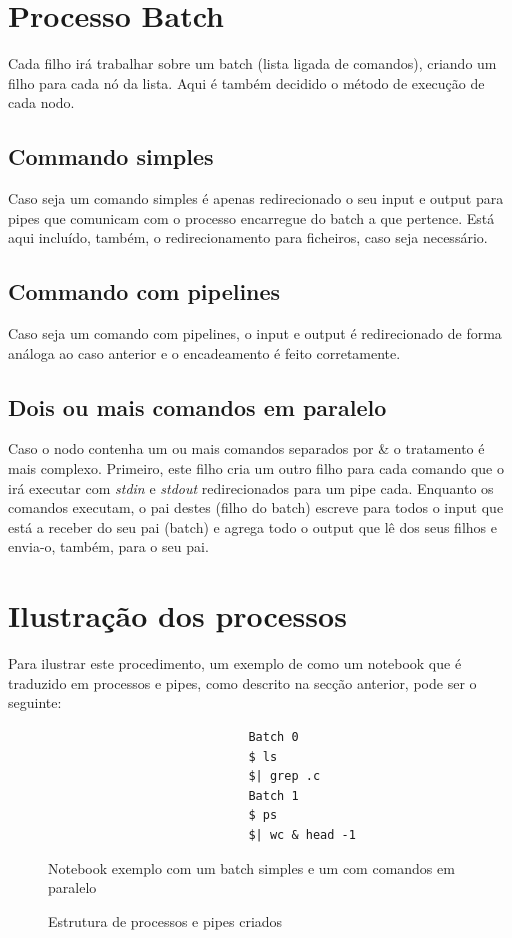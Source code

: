 \documentclass[12pt,a4paper]{report}
\begin{document}
    \section{Processo Batch}
        Cada filho irá trabalhar sobre um batch (lista ligada de comandos),
        criando um filho para cada nó da lista. Aqui é também decidido o método
        de execução de cada nodo.
        \subsection{Commando simples}
            Caso seja um comando simples é apenas redirecionado o seu input e
            output para pipes que comunicam com o processo encarregue do batch a
            que pertence. Está aqui incluído, também, o redirecionamento para
            ficheiros, caso seja necessário.
        \subsection{Commando com pipelines}
            Caso seja um comando com pipelines, o input e output é redirecionado
            de forma análoga ao caso anterior e o encadeamento é feito
            corretamente.
        \subsection{Dois ou mais comandos em paralelo}
            Caso o nodo contenha um ou mais comandos separados por \& o
            tratamento é mais complexo. Primeiro, este filho cria um outro
            filho para cada comando que o irá executar com \textit{stdin}
            e \textit{stdout} redirecionados para um pipe cada. Enquanto os
            comandos executam, o pai destes (filho do batch) escreve para todos
            o input que está a receber do seu pai (batch) e agrega todo o
            output que lê dos seus filhos e envia-o, também, para o seu pai.
\clearpage
    \section{Ilustração dos processos}
    Para ilustrar este procedimento, um exemplo de como um notebook que é
    traduzido em processos e pipes, como descrito na secção anterior, pode
    ser o seguinte:
    \begin{figure}[h]
        \begin{verbatim}
                            Batch 0
                            $ ls
                            $| grep .c
                            Batch 1
                            $ ps
                            $| wc & head -1
        \end{verbatim}
        \caption{Notebook exemplo com um batch simples e um com comandos em
                paralelo}
    \end{figure}
    \begin{figure}[h]
        
        \caption{Estrutura de processos e pipes criados}
    \end{figure}
\end{document}
